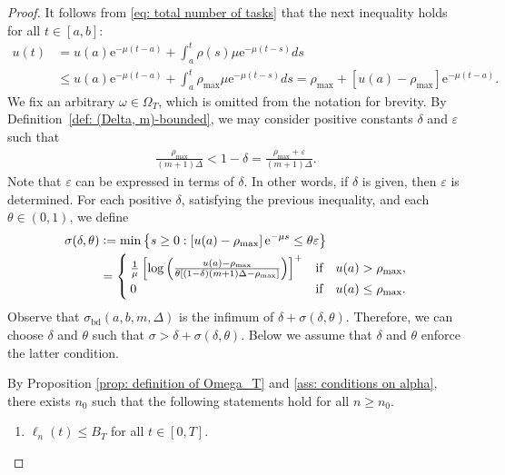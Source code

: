 \documentclass[a4paper, 12pt]{article}
\theoremstyle{definition}
\newcommand{\set}[2]{\left\{#1 : #2\right\}}
\newcommand{\defeq}{\vcentcolon=}
\newcommand{\bd}{\mathrm{bd}}
\newcommand{\e}{\mathrm{e}}
\begin{document}
\begin{proof}
It follows from \eqref{eq: total number of tasks} that the next inequality holds for all $t \in [a , b]$:
\begin{equation}
	\label{eq: upper bound for u}
	\begin{split}
		u(t) &= u(a)\e^{-\mu(t - a)} + \int_a^t \rho(s) \mu \e^{-\mu(t - s)}ds \\
		&\leq u(a)\e^{-\mu(t - a)} + \int_a^t \rho_{\max} \mu \e^{-\mu(t - s)}ds = \rho_{\max} + \left[u(a) - \rho_{\max}\right]\e^{-\mu(t - a)}.
	\end{split}
\end{equation}
We fix an arbitrary $\omega \in \Omega_T$, which is omitted from the notation for brevity. By Definition~\ref{def: (Delta, m)-bounded}, we may consider positive constants $\delta$ and $\varepsilon$ such that
\begin{align*}
	\frac{\rho_{\max}}{(m + 1) \Delta} < 1 - \delta = \frac{\rho_{\max} + \varepsilon}{(m + 1) \Delta}.
\end{align*}
Note that $\varepsilon$ can be expressed in terms of $\delta$. In other words, if $\delta$ is given, then $\varepsilon$ is determined. For each positive $\delta$, satisfying the previous inequality, and each $\theta \in (0, 1)$, we define
\begin{align*}
	\sigma(\delta, \theta) &\defeq \min \set{s \geq 0}{\left[u(a) - \rho_{\max}\right]\e^{-\mu s} \leq \theta \varepsilon} \\
	&= \begin{cases}
		\frac{1}{\mu}\left[\log\left(\frac{u(a) - \rho_{\max}}{\theta\left[(1 - \delta)(m + 1) \Delta - \rho_{\max}\right]}\right)\right]^+	&	\text{if} \quad u(a) > \rho_{\max}, \\
		0	&	\text{if} \quad u(a) \leq \rho_{\max}.
	\end{cases}
\end{align*}
Observe that $\sigma_\bd(a, b, m, \Delta)$ is the infimum of $\delta + \sigma(\delta, \theta)$. Therefore, we can choose $\delta$ and $\theta$ such that $\sigma > \delta + \sigma(\delta, \theta)$. Below we assume that $\delta$ and $\theta$ enforce the latter condition.

By Proposition \ref{prop: definition of Omega_T} and \eqref{ass: conditions on alpha}, there exists $n_0$ such that the following statements hold for all $n \geq n_0$.
\begin{enumerate}
	\item[(i)] $\ell_n(t) \leq B_T$ for all $t \in [0, T]$.
	

\end{enumerate}
\end{proof}
\end{document}

